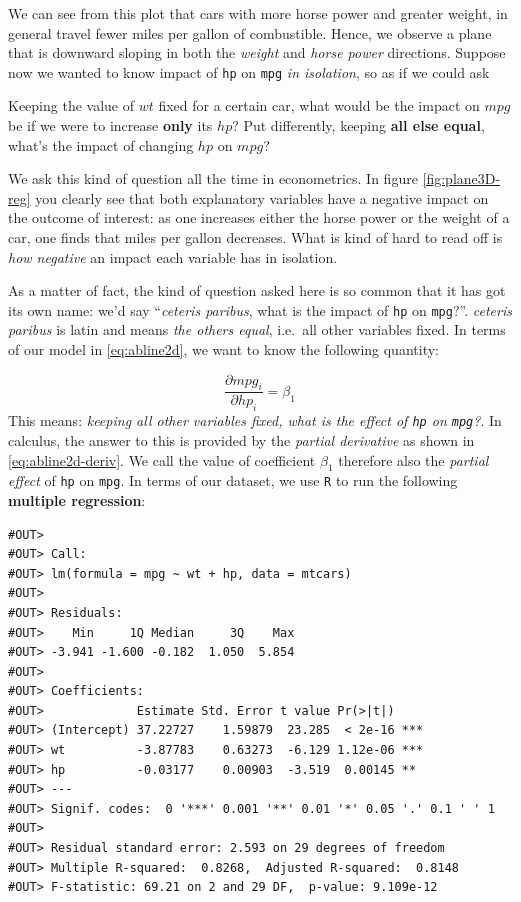 \documentclass[]{book}
\newenvironment{tip}{\begin{tcolorbox}[colback=green!5!white,colframe=green,title=\textbf{Tip:}]}{\end{tcolorbox}}
\theoremstyle{definition}
\theoremstyle{definition}
\theoremstyle{definition}
\theoremstyle{remark}
\begin{document}
We can see from this plot that cars with more horse power and greater
weight, in general travel fewer miles per gallon of combustible. Hence,
we observe a plane that is downward sloping in both the \emph{weight}
and \emph{horse power} directions. Suppose now we wanted to know impact
of \texttt{hp} on \texttt{mpg} \emph{in isolation}, so as if we could
ask

\begin{tip}
Keeping the value of \(wt\) fixed for a certain car, what would be the
impact on \(mpg\) be if we were to increase \textbf{only} its \(hp\)?
Put differently, keeping \textbf{all else equal}, what's the impact of
changing \(hp\) on \(mpg\)?
\end{tip}

 We ask this kind of question all the time in econometrics. In figure
\ref{fig:plane3D-reg} you clearly see that both explanatory variables
have a negative impact on the outcome of interest: as one increases
either the horse power or the weight of a car, one finds that miles per
gallon decreases. What is kind of hard to read off is \emph{how
negative} an impact each variable has in isolation.

As a matter of fact, the kind of question asked here is so common that
it has got its own name: we'd say ``\emph{ceteris paribus}, what is the
impact of \texttt{hp} on \texttt{mpg}?''. \emph{ceteris paribus} is
latin and means \emph{the others equal}, i.e.~all other variables fixed.
In terms of our model in \eqref{eq:abline2d}, we want to know the
following quantity:

\[
\frac{\partial mpg_i}{\partial hp_i} = \beta_1 \label{eq:abline2d-deriv}
\] This means: \emph{keeping all other variables fixed, what is the
effect of \texttt{hp} on \texttt{mpg}?}. In calculus, the answer to this
is provided by the \emph{partial derivative} as shown in
\eqref{eq:abline2d-deriv}. We call the value of coefficient \(\beta_1\)
therefore also the \emph{partial effect} of \texttt{hp} on \texttt{mpg}.
In terms of our dataset, we use \texttt{R} to run the following
\textbf{multiple regression}:

\begin{verbatim}
#OUT> 
#OUT> Call:
#OUT> lm(formula = mpg ~ wt + hp, data = mtcars)
#OUT> 
#OUT> Residuals:
#OUT>    Min     1Q Median     3Q    Max 
#OUT> -3.941 -1.600 -0.182  1.050  5.854 
#OUT> 
#OUT> Coefficients:
#OUT>             Estimate Std. Error t value Pr(>|t|)    
#OUT> (Intercept) 37.22727    1.59879  23.285  < 2e-16 ***
#OUT> wt          -3.87783    0.63273  -6.129 1.12e-06 ***
#OUT> hp          -0.03177    0.00903  -3.519  0.00145 ** 
#OUT> ---
#OUT> Signif. codes:  0 '***' 0.001 '**' 0.01 '*' 0.05 '.' 0.1 ' ' 1
#OUT> 
#OUT> Residual standard error: 2.593 on 29 degrees of freedom
#OUT> Multiple R-squared:  0.8268,  Adjusted R-squared:  0.8148 
#OUT> F-statistic: 69.21 on 2 and 29 DF,  p-value: 9.109e-12
\end{verbatim}
\end{document}
